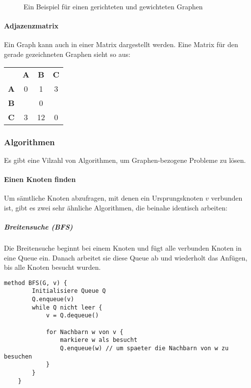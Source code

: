 \documentclass{article}
\begin{document}
	\begin{figure}[h!]
		\centering
		
		\caption{Ein Beispiel für einen gerichteten und gewichteten Graphen}
	\end{figure}

	\paragraph{Adjazenzmatrix}
	Ein Graph kann auch in einer Matrix dargestellt werden. Eine Matrix für den gerade gezeichneten Graphen sieht so aus:

	
	\begin{center}
		\def\arraystretch{1.1}
		\begin{tabular}{ | c | c | c | c | }
			\hline 
						& \textbf{A} 	& \textbf{B} 	& \textbf{C} 	\\
			\textbf{A} 	& 0 			& 1 			& 3 			\\
			\textbf{B} 	& 				& 0 			& 				\\
			\textbf{C} 	& 3 			& 12 			& 0 			\\ 
			\hline
		\end{tabular}
	\end{center}

	\subsubsection{Algorithmen}
	Es gibt eine Vilzahl von Algorithmen, um Graphen-bezogene Probleme zu lösen.

	\paragraph{Einen Knoten finden}
	Um sämtliche Knoten abzufragen, mit denen ein Ursprungsknoten $v$ verbunden ist, gibt es zwei sehr ähnliche Algorithmen, die beinahe identisch arbeiten:

	\subparagraph{Breitensuche (BFS)}
	Die Breitensuche beginnt bei einem Knoten und fügt alle verbunden Knoten in eine Queue ein. Danach arbeitet sie diese Queue ab und wiederholt das Anfügen, bis alle Knoten besucht wurden. 

	\begin{lstlisting}[caption=Ein Beispiel für BFS in Pseudocode]
	method BFS(G, v) {
		Initialisiere Queue Q
		Q.enqueue(v)
		while Q nicht leer {
			v = Q.dequeue()

			for Nachbarn w von v {
				markiere w als besucht
				Q.enqueue(w) // um spaeter die Nachbarn von w zu besuchen
			}
		}
	}
	\end{lstlisting}
\end{document}
